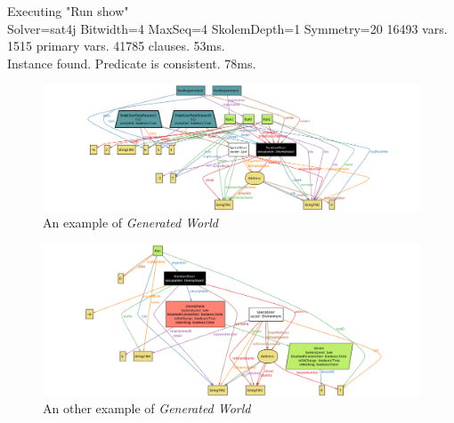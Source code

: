    \vspace{1cm}

   Executing "Run show" \\ \noindent
      Solver=sat4j Bitwidth=4 MaxSeq=4 SkolemDepth=1 Symmetry=20
      16493 vars. 1515 primary vars. 41785 clauses. 53ms. \\ \noindent
      Instance found. Predicate is consistent. 78ms.

   \vspace{1cm}

   \begin{figure}[H]
   \begin{center}
     \includegraphics[width=0.80\paperwidth]{./img/alloy/alloy2.png}
     \hspace{0.05\linewidth}
     \centering
     \caption{An example of \textit{Generated World}}
     \label{img:generatedWorld}
   \end{center}
   \end{figure}

 \begin{figure}[H]
 \begin{center}
   \includegraphics[width=0.80\paperwidth]{./img/alloy/alloy3.png}
   \hspace{0.05\linewidth}
   \centering
   \caption{An other example of \textit{Generated World}}
   \label{img:generatedWorld}
 \end{center}
 \end{figure}

